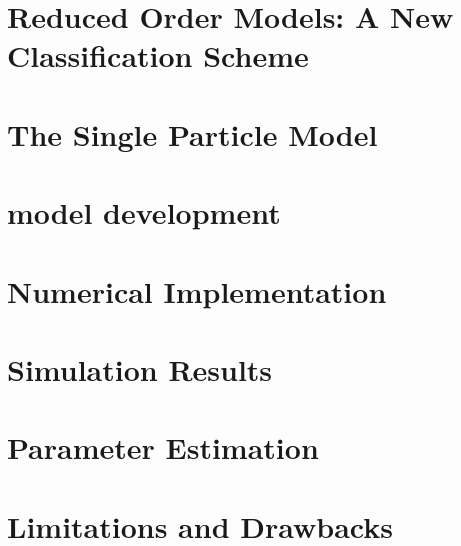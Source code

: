 



\graphicspath{{4/figures/}}

\section{Reduced Order Models: A New Classification Scheme}\label{sec:classificationscheme}


\section{The Single Particle Model}


\section{ model development}\label{sec:spmmodeldevelopment}


\section{Numerical Implementation}\label{sec:numericalimplementation}


\section{Simulation Results}\label{sec:basicspmsimresults}


\section{ Parameter Estimation}\label{sec:spmparameterestim}
\section{Limitations and Drawbacks}\label{subsec:basicspmlimitations}

